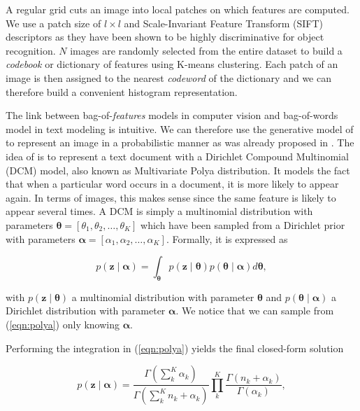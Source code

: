 A regular grid cuts an image into local patches on
which features are computed.  We use a patch size of $l\times l$ and
Scale-Invariant Feature Transform (SIFT) \cite{lowe04distinctive}
descriptors as they have been shown to be highly discriminative for
object recognition. $N$ images are randomly selected from the entire
dataset to build a \emph{codebook} or dictionary of features using
K-means clustering. Each patch of an image is then assigned to the
nearest \emph{codeword} of the dictionary and we can therefore build a
convenient histogram representation.

The link between bag-of-\emph{features} models in computer vision and
bag-of-words model in text modeling is intuitive. We can therefore use
the generative model of \cite{madsen05modeling} to represent an image
in a probabilistic manner as was already proposed in
\cite{ranganathan09bayesian}.  The idea of \cite{madsen05modeling} is
to represent a text document with a Dirichlet Compound Multinomial
(DCM) model, also known as Multivariate Polya distribution. It models
the fact that when a particular word occurs in a document, it is more
likely to appear again. In terms of images, this makes sense since the
same feature is likely to appear several times. A DCM is simply a
multinomial distribution with parameters $\boldsymbol{\theta}=
[\theta_1,\theta_2,\dots,\theta_K]$ which have been sampled from a
Dirichlet prior with parameters $\boldsymbol{\alpha}=
[\alpha_1,\alpha_2,\dots,\alpha_K]$. Formally, it is expressed as

\begin{equation}
\label{eqn:polya}
p(\mathbf{z}\mid \boldsymbol{\alpha}) = \int_{\boldsymbol{\theta}} p(\mathbf{z}\mid \boldsymbol{\theta})
  p(\boldsymbol{\theta}\mid \boldsymbol{\alpha})d\boldsymbol{\theta},
\end{equation}

with $p(\mathbf{z}\mid \boldsymbol{\theta})$ a multinomial distribution with
parameter $\boldsymbol{\theta}$ and $p(\boldsymbol{\theta}\mid \boldsymbol{\alpha})$
a Dirichlet distribution with parameter $\boldsymbol{\alpha}$. We notice that we
can sample from (\ref{eqn:polya}) only knowing $\boldsymbol{\alpha}$.

Performing the integration in (\ref{eqn:polya}) yields the final closed-form
solution

\begin{equation}
\label{eqn:polya_integrated}
p(\mathbf{z}\mid \boldsymbol{\alpha}) =
  \frac{\Gamma(\sum_k^K\alpha_k)}{\Gamma(\sum_k^K n_k + \alpha_k)}
  \prod_k^K\frac{\Gamma(n_k+\alpha_k)}{\Gamma(\alpha_k)},
\end{equation}

